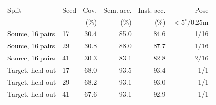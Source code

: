 \begin{tabular}{llrrrr}
\toprule
Split & Seed & Cov. & Sem. acc. & Inst. acc. & Pose \\ 
 & & (\%) & (\%) & (\%) & $<5^\circ/0.25$m \\ 
\midrule
Source, 16 pairs & 17 & 30.4 & 85.0 & 84.6 & 1/16 \\
Source, 16 pairs & 29 & 30.8 & 88.0 & 87.7 & 1/16 \\
Source, 16 pairs & 41 & 30.3 & 83.1 & 82.8 & 2/16 \\
Target, held out & 17 & 68.0 & 93.5 & 93.4 & 1/1 \\
Target, held out & 29 & 68.2 & 93.1 & 93.0 & 1/1 \\
Target, held out & 41 & 67.6 & 93.1 & 92.9 & 1/1 \\
\bottomrule
\end{tabular}
